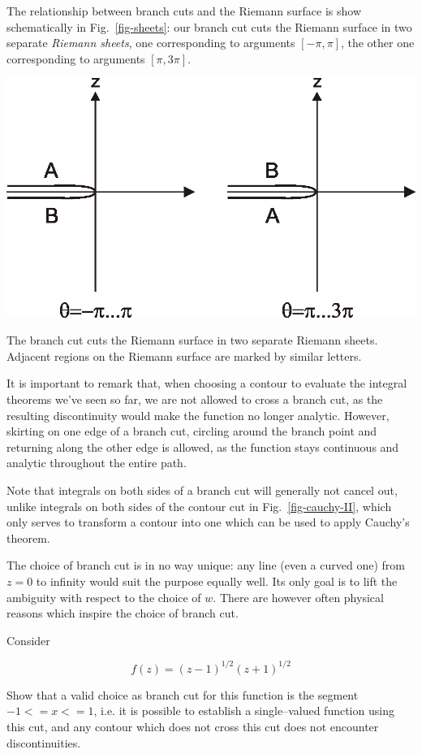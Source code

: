 The relationship between branch cuts and the Riemann surface is show
schematically in Fig.~\ref{fig-sheets}: our branch cut cuts the Riemann surface
in two separate \emph{Riemann sheets}, one corresponding to arguments $[-\pi,
\pi]$, the other one corresponding to arguments $[\pi,3 \pi]$.

\begin{marginfigure}
\centering
\includegraphics{complex/figures/sheets}
\caption{The branch cut cuts the Riemann surface in two separate Riemann sheets.
Adjacent regions on the Riemann surface are marked by similar letters.}
\label{fig-sheets}
\end{marginfigure}

It is important to remark that, when choosing a contour to evaluate the integral
theorems we've seen so far, we are not allowed to cross a branch cut, as the
resulting discontinuity would make the function no longer analytic. However,
skirting on one edge of a branch cut, circling around the branch point and
returning along the other edge is allowed, as the function stays continuous and
analytic throughout the entire path. 

Note that integrals on both sides of a branch cut will generally not cancel out,
unlike integrals on both sides of the contour cut in Fig.~\ref{fig-cauchy-II},
which only serves to transform a contour into one which can be used to apply
Cauchy's theorem.

The choice of branch cut is in no way unique: any line (even a curved one) from
$z=0$ to infinity would suit the purpose equally well. Its only goal is to lift
the ambiguity with respect to the choice of $w$. There are however often
physical reasons which inspire the choice of branch cut.

\begin{exer}
Consider

$$f(z)=(z-1)^{1/2}(z+1)^{1/2}$$

Show that a valid choice as branch cut for this function is the segment $-1<= x <= 1$, i.e. it is possible to establish a single--valued function using this cut, and any contour which does not cross this cut does not encounter discontinuities.
\end{exer}

